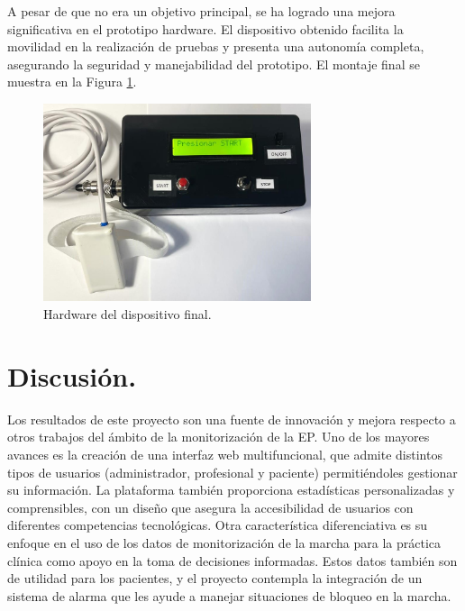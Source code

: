 A pesar de que no era un objetivo principal, se ha logrado una mejora significativa en el prototipo hardware. El dispositivo obtenido facilita la movilidad en la realización de pruebas y presenta una autonomía completa, asegurando la seguridad y manejabilidad del prototipo. El montaje final se muestra en la Figura \ref{fig:hardwareFinal}.
\begin{figure}[h]
    \centering
    \includegraphics[width=0.7\textwidth]{img/E1_Planos/montajeFinal.jpg}
    \caption{Hardware del dispositivo final.}
    \label{fig:hardwareFinal}
\end{figure}


\section{Discusión.}

Los resultados de este proyecto son una fuente de innovación y mejora respecto a otros trabajos del ámbito de la monitorización de la EP. Uno de los mayores avances es la creación de una interfaz web multifuncional, que admite distintos tipos de usuarios (administrador, profesional y paciente) permitiéndoles gestionar su información. La plataforma también proporciona estadísticas personalizadas y comprensibles, con un diseño que asegura la accesibilidad de usuarios con diferentes competencias tecnológicas. Otra característica diferenciativa es su enfoque en el uso de los datos de monitorización de la marcha para la práctica clínica como apoyo en la toma de decisiones informadas. Estos datos también son de utilidad para los pacientes, y el proyecto contempla la integración de un sistema de alarma que les ayude a manejar situaciones de bloqueo en la marcha.


